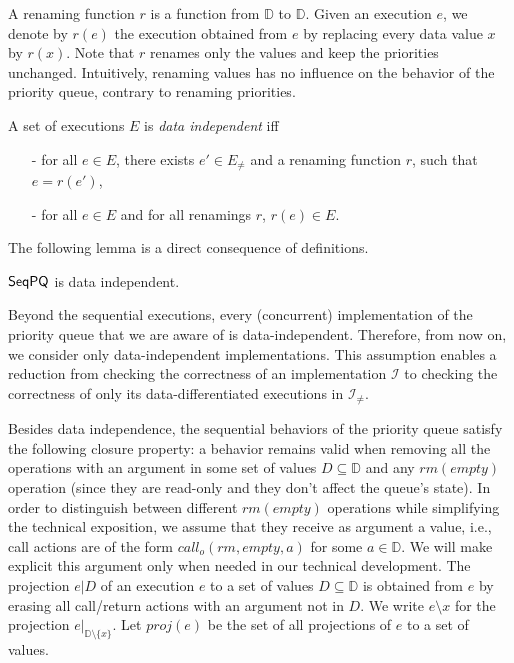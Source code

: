 A renaming function $r$ is a function from $\mathbb{D}$ to $\mathbb{D}$. Given an execution $e$, we denote by $r(e)$ the execution obtained from $e$ by replacing every data value $x$ by $r(x)$. Note that $r$ renames only the values and keep the priorities unchanged. Intuitively, renaming values has no influence on the behavior of the priority queue, contrary to renaming priorities.

\begin{definition}\label{def:priority-value data-independence}
A set of executions $E$ is \emph{data independent} iff
\begin{itemize}
\setlength{\itemsep}{0.5pt}
\item[-] for all $e \in E$, there exists $e' \in E_{\neq}$ and a renaming function $r$, such that $e=r(e')$,

\item[-] for all $e \in E$ and for all renamings $r$, $r(e) \in E$.
\end{itemize}
\end{definition}

The following lemma is a direct consequence of definitions.

\begin{lemma}
$\mathsf{SeqPQ}$ is data independent.
\end{lemma}

Beyond the sequential executions, every (concurrent) implementation of the priority queue that we are aware of is data-independent. Therefore, from now on, we consider only data-independent implementations. This assumption enables a reduction from checking the correctness of an implementation $\mathcal{I}$ to checking the correctness of only its data-differentiated executions in $\mathcal{I}_{\neq}$.

Besides data independence, the sequential behaviors of the priority queue satisfy the following closure property: a behavior remains valid when removing all the operations with an argument in some set of values $D \subseteq \mathbb{D}$ and any $\textit{rm}(\textit{empty})$ operation (since they are read-only and they don't affect the queue's state).
In order to distinguish between different $\textit{rm}(\textit{empty})$ operations while simplifying the technical exposition, we assume that they receive as argument a value, i.e., call actions are of the form $\textit{call}_o(\textit{rm},\textit{empty},a)$ for some $a\in \mathbb{D}$. We will make explicit this argument only when needed in our technical development. The projection $e \vert D$ of an execution $e$ to a set of values $D \subseteq \mathbb{D}$ is obtained from $e$ by erasing all call/return actions with an argument not in $D$. We write $e \setminus x$ for the projection $e \vert_{ \mathbb{D} \setminus \{ x \} }$. Let $\textit{proj}(e)$ be the set of all projections of $e$ to a set of values.

